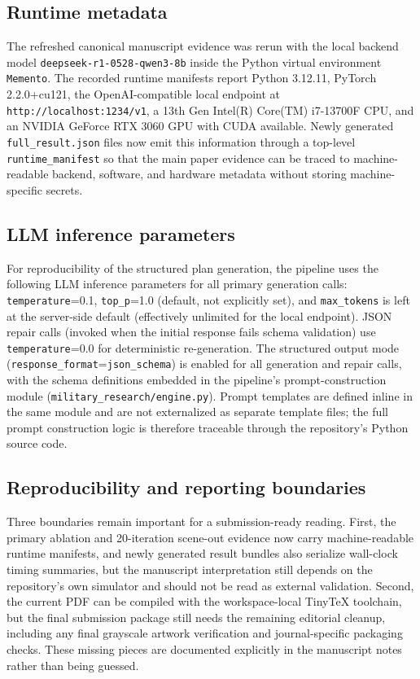 \subsection{Runtime metadata}

The refreshed canonical manuscript evidence was rerun with the local backend model \texttt{deepseek-r1-0528-qwen3-8b} inside the Python virtual environment \texttt{Memento}. The recorded runtime manifests report Python 3.12.11, PyTorch 2.2.0+cu121, the OpenAI-compatible local endpoint at \texttt{http://localhost:1234/v1}, a 13th Gen Intel(R) Core(TM) i7-13700F CPU, and an NVIDIA GeForce RTX 3060 GPU with CUDA available. Newly generated \texttt{full\_result.json} files now emit this information through a top-level \texttt{runtime\_manifest} so that the main paper evidence can be traced to machine-readable backend, software, and hardware metadata without storing machine-specific secrets.

\subsection{LLM inference parameters}

For reproducibility of the structured plan generation, the pipeline uses the following LLM inference parameters for all primary generation calls: \texttt{temperature}=0.1, \texttt{top\_p}=1.0 (default, not explicitly set), and \texttt{max\_tokens} is left at the server-side default (effectively unlimited for the local endpoint). JSON repair calls (invoked when the initial response fails schema validation) use \texttt{temperature}=0.0 for deterministic re-generation. The structured output mode (\texttt{response\_format}=\texttt{json\_schema}) is enabled for all generation and repair calls, with the schema definitions embedded in the pipeline's prompt-construction module (\texttt{military\_research/engine.py}). Prompt templates are defined inline in the same module and are not externalized as separate template files; the full prompt construction logic is therefore traceable through the repository's Python source code.

\subsection{Reproducibility and reporting boundaries}

Three boundaries remain important for a submission-ready reading. First, the primary ablation and 20-iteration scene-out evidence now carry machine-readable runtime manifests, and newly generated result bundles also serialize wall-clock timing summaries, but the manuscript interpretation still depends on the repository's own simulator and should not be read as external validation. Second, the current PDF can be compiled with the workspace-local TinyTeX toolchain, but the final submission package still needs the remaining editorial cleanup, including any final grayscale artwork verification and journal-specific packaging checks. These missing pieces are documented explicitly in the manuscript notes rather than being guessed.

